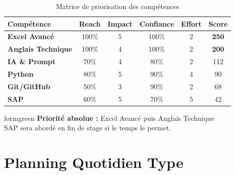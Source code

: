 \documentclass[12pt,a4paper]{article}
\begin{document}
\begin{table}[h]
\centering
\caption{Matrice de priorisation des compétences}
\begin{tabular}{|l|c|c|c|c|c|}
\hline
\rowcolor{gray!20}
\textbf{Compétence} & \textbf{Reach} & \textbf{Impact} & \textbf{Confiance} & \textbf{Effort} & \textbf{Score} \\
\hline
\textbf{Excel Avancé} & 100\% & 5 & 100\% & 2 & \textbf{250} \\
\textbf{Anglais Technique} & 100\% & 4 & 100\% & 2 & \textbf{200} \\
\textbf{IA \& Prompt} & 70\% & 4 & 80\% & 2 & 112 \\
\textbf{Python} & 80\% & 5 & 90\% & 4 & 90 \\
\textbf{Git/GitHub} & 50\% & 3 & 90\% & 2 & 68 \\
\textbf{SAP} & 60\% & 5 & 70\% & 5 & 42 \\
\hline
\end{tabular}
\end{table}

\begin{infobox}{formgreen}
\centering
\textbf{Priorité absolue :} Excel Avancé puis Anglais Technique \\
SAP sera abordé en fin de stage si le temps le permet.
\end{infobox}

\newpage

\section{Planning Quotidien Type}
\end{document}
